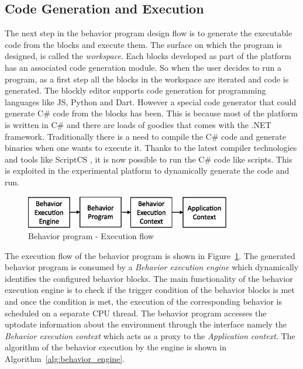 \subsection{Code Generation and Execution}
The next step in the behavior program design flow is to generate the executable code from the blocks and execute them. The surface on which the program is designed, is called the \emph{workspace}. Each blocks developed as part of the platform has an associated code generation module. So when the user decides to run a program, as a first step all the blocks in the workspace are iterated and code is generated. The blockly editor supports code generation for programming languages like JS, Python and Dart. However a special code generator that could generate C\# code from the blocks has been. This is because most of the platform is written in C\# and there are loads of goodies that comes with the .NET framework. Traditionally there is a need to compile the C\# code and generate binaries when one wants to execute it. Thanks to the latest compiler technologies and tools like ScriptCS \cite{ScriptCS}, it is now possible to run the C\# code like scripts. This is exploited in the experimental platform to dynamically generate the code and run.
\begin{figure}[H]
\centering
\includegraphics[width=0.8\textwidth]{../thesis/assets/execution_flow.eps}
\caption[Behavior program - Execution flow]{Behavior program - Execution flow}
\label{fig:program_execution}
\end{figure}
 The execution flow of the behavior program is shown in Figure~\ref{fig:program_execution}. The generated behavior program is consumed by a \emph{Behavior execution engine} which dynamically identifies the configured behavior blocks. The main functionality of the behavior execution engine is to check if the trigger condition of the behavior blocks is met and once the condition is met, the execution of the corresponding behavior is scheduled on a separate CPU thread. The behavior program accesses the uptodate information about the environment through the interface namely the \emph{Behavior execution context} which acts as a proxy to the \emph{Application context}. The algorithm of the behavior execution by the engine is shown in Algorithm~\ref{alg:behavior_engine}.


